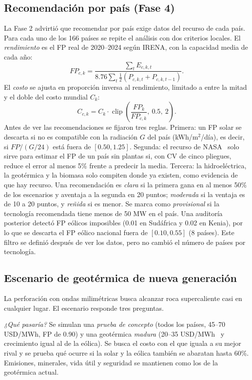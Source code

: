 \documentclass[journal,letterpaper]{IEEEtran}
\begin{document}
\subsection{Recomendación por país (Fase 4)}
La Fase 2 advirtió que recomendar por país exige datos del recurso de cada país. Para cada uno de los 166 países se repite el análisis con dos criterios locales. El \emph{rendimiento} es el FP real de 2020--2024 según IRENA, con la capacidad media de cada año:
\begin{equation}
FP_{c,k} = \frac{\sum_t E_{c,k,t}}{8.76 \sum_t \tfrac{1}{2}(P_{c,k,t} + P_{c,k,t-1})}.
\end{equation}
El \emph{costo} se ajusta en proporción inversa al rendimiento, limitado a entre la mitad y el doble del costo mundial $C_k$:
\begin{equation}
C_{c,k} = C_k \cdot \operatorname{clip}\!\left(\frac{FP_k}{FP_{c,k}},\ 0.5,\ 2\right).
\end{equation}
Antes de ver las recomendaciones se fijaron tres reglas. Primera: un FP solar se descarta si no es compatible con la radiación $G$ del país (kWh/m$^2$/día), es decir, si $FP/(G/24)$ está fuera de $[0.50, 1.25]$. Segunda: el recurso de NASA~\cite{nasapower} solo sirve para estimar el FP de un país sin plantas si, con CV de cinco pliegues, reduce el error al menos 5\% frente a predecir la media. Tercera: la hidroeléctrica, la geotérmica y la biomasa solo compiten donde ya existen, como evidencia de que hay recurso. Una recomendación es \emph{clara} si la primera gana en al menos 50\% de los escenarios y aventaja a la segunda en 20 puntos; \emph{moderada} si la ventaja es de 10 a 20 puntos, y \emph{reñida} si es menor. Se marca como \emph{provisional} si la tecnología recomendada tiene menos de 50 MW en el país. Una auditoría posterior detectó FP eólicos imposibles (0.01 en Sudáfrica y 0.02 en Kenia), por lo que se descarta el FP eólico nacional fuera de $[0.10, 0.55]$ (8 países). Este filtro se definió después de ver los datos, pero no cambió el número de países por tecnología.

\subsection{Escenario de geotérmica de nueva generación}\label{sec:metgeo}
La perforación con ondas milimétricas busca alcanzar roca supercaliente casi en cualquier lugar. El escenario responde tres preguntas.

\emph{¿Qué pasaría?} Se simulan una \emph{prueba de concepto} (todos los países, 45--70 USD/MWh, FP de 0.90) y una geotérmica \emph{madura} (20--35 USD/MWh~\cite{catf2022} y crecimiento igual al de la eólica). Se busca el costo con el que iguala a su mejor rival y se prueba qué ocurre si la solar y la eólica también se abaratan hasta 60\%. Emisiones, minerales, vida útil y seguridad se mantienen como los de la geotérmica actual.
\end{document}
